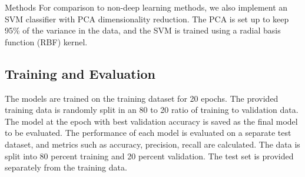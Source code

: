 \documentclass[12pt, a4paper]{article}
\begin{document}
\begin{section}{Methods}
    For comparison to non-deep learning methods, we also implement an SVM classifier with PCA dimensionality reduction. The PCA is set up to keep 95\% of the variance in the data, and the SVM is trained using a radial basis function (RBF) kernel.
    \subsection{Training and Evaluation}
    The models are trained on the training dataset for 20 epochs. The provided training data is randomly split in an 80 to 20 ratio of training to validation data. The model at the epoch with best validation accuracy is saved as the final model to be evaluated. The performance of each model is evaluated on a separate test dataset, and metrics such as accuracy, precision, recall are calculated.
    The data is split into 80 percent training and 20 percent validation. The test set is provided separately from the training data.
\end{section}
\end{document}
